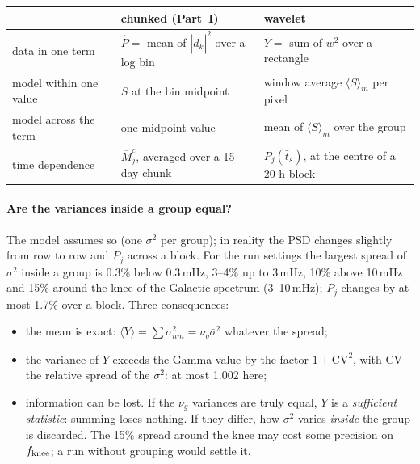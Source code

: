 \documentclass[11pt,a4paper]{article}
\newcommand{\Pbar}{\hat{P}}
\newcommand{\Mbar}{\overline{M}}
\begin{document}
\begin{center}
\renewcommand{\arraystretch}{1.25}
\small
\begin{tabular}{@{}p{}p{}p{}@{}}
\toprule
 & chunked (Part~I) & wavelet \\
\midrule
data in one term & $\Pbar = $ mean of $|\tilde d_k|^2$ over a log bin & $Y=$ sum of $w^2$ over a rectangle \\
model within one value & $S$ at the bin midpoint & window average $\langle S\rangle_m$ per pixel \\
model across the term & one midpoint value & mean of $\langle S\rangle_m$ over the group \\
time dependence & $\Mbar^c_j$, averaged over a 15-day chunk & $P_j(\bar t_s)$, at the centre of a 20-h block \\
\bottomrule
\end{tabular}
\end{center}

\paragraph{Are the variances inside a group equal?} The model assumes so (one
$\sigma^2$ per group); in reality the PSD changes slightly from row to row and $P_j$
across a block. For the run settings the largest spread of $\sigma^2$ inside a group
is 0.3\% below 0.3\,mHz, 3--4\% up to 3\,mHz, 10\% above 10\,mHz and 15\% around the
knee of the Galactic spectrum (3--10\,mHz); $P_j$ changes by at most 1.7\% over a
block. Three consequences:
\begin{itemize}
  \item the mean is exact: $\langle Y\rangle=\sum\sigma^2_{nm}=\nu_g\bar\sigma^2$
        whatever the spread;
  \item the variance of $Y$ exceeds the Gamma value by the factor $1+\mathrm{CV}^2$,
        with CV the relative spread of the $\sigma^2$: at most 1.002 here;
  \item information can be lost. If the $\nu_g$ variances are truly equal, $Y$ is a
        \emph{sufficient statistic}: summing loses nothing. If they differ, how
        $\sigma^2$ varies \emph{inside} the group is discarded. The 15\% spread around
        the knee may cost some precision on $f_{\rm knee}$; a run without grouping
        would settle it.
\end{itemize}

\end{document}
